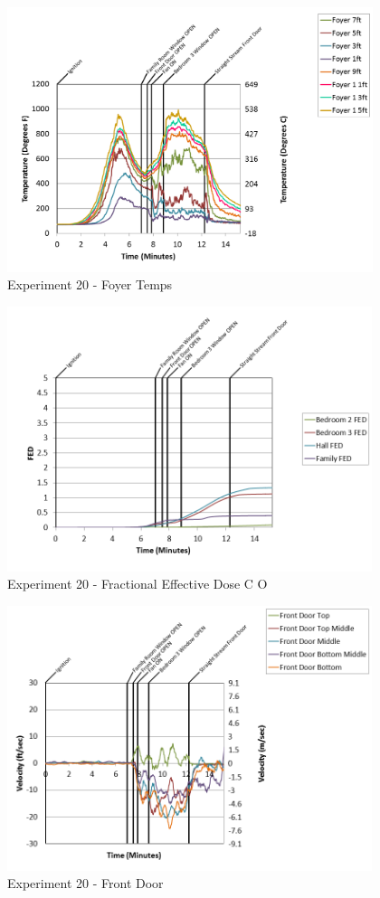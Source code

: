 \documentclass{article}
\begin{document}
\begin{appendices}
\begin{figure}[h!]
	\centering
	\includegraphics[height=3.05in]{0_Images/Results_Charts/Exp_20_Charts/FoyerTemps.png}
	\caption{Experiment 20 - Foyer Temps}
\end{figure}

\clearpage

\begin{figure}[h!]
	\centering
	\includegraphics[height=3.05in]{0_Images/Results_Charts/Exp_20_Charts/FractionalEffectiveDoseCO.png}
	\caption{Experiment 20 - Fractional Effective Dose C O}
\end{figure}


\begin{figure}[h!]
	\centering
	\includegraphics[height=3.05in]{0_Images/Results_Charts/Exp_20_Charts/FrontDoor.png}
	\caption{Experiment 20 - Front Door}
\end{figure}


\end{appendices}
\end{document}
